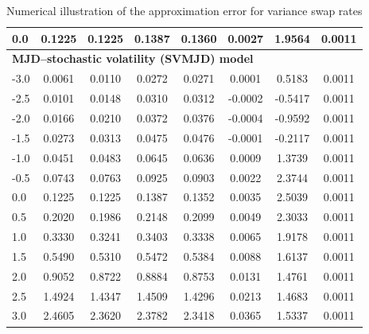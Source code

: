 \begin{table}[ht]
{\begin{tabular}{lccccccc}
            0.0 & 0.1225 & 0.1225 & 0.1387 & 0.1360 & 0.0027 & 1.9564 & 0.0011 \\
            \midrule
            \multicolumn{8}{l}{\textbf{MJD–stochastic volatility (SVMJD) model}}\\
            -3.0 & 0.0061 & 0.0110 & 0.0272 & 0.0271 & 0.0001 & 0.5183 & 0.0011 \\
            -2.5 & 0.0101 & 0.0148 & 0.0310 & 0.0312 & -0.0002 & -0.5417 & 0.0011 \\
            -2.0 & 0.0166 & 0.0210 & 0.0372 & 0.0376 & -0.0004 & -0.9592 & 0.0011 \\
            -1.5 & 0.0273 & 0.0313 & 0.0475 & 0.0476 & -0.0001 & -0.2117 & 0.0011 \\
            -1.0 & 0.0451 & 0.0483 & 0.0645 & 0.0636 & 0.0009 & 1.3739 & 0.0011 \\
            -0.5 & 0.0743 & 0.0763 & 0.0925 & 0.0903 & 0.0022 & 2.3744 & 0.0011 \\
            0.0 & 0.1225 & 0.1225 & 0.1387 & 0.1352 & 0.0035 & 2.5039 & 0.0011 \\
            0.5 & 0.2020 & 0.1986 & 0.2148 & 0.2099 & 0.0049 & 2.3033 & 0.0011 \\
            1.0 & 0.3330 & 0.3241 & 0.3403 & 0.3338 & 0.0065 & 1.9178 & 0.0011 \\
            1.5 & 0.5490 & 0.5310 & 0.5472 & 0.5384 & 0.0088 & 1.6137 & 0.0011 \\
            2.0 & 0.9052 & 0.8722 & 0.8884 & 0.8753 & 0.0131 & 1.4761 & 0.0011 \\
            2.5 & 1.4924 & 1.4347 & 1.4509 & 1.4296 & 0.0213 & 1.4683 & 0.0011 \\
            3.0 & 2.4605 & 2.3620 & 2.3782 & 2.3418 & 0.0365 & 1.5337 & 0.0011 \\
            \midrule
        \end{tabular}
    }
    \caption{Numerical illustration of the approximation error for variance swap rates}
    \label{tab:robustness_analysis_approx-error}
\end{table}

